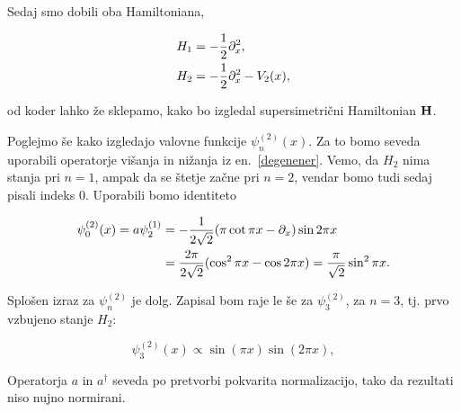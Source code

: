 Sedaj smo dobili oba Hamiltoniana,

\begin{align}
	H_1 &= -\frac{1}{2}\partial_x^2, \notag \\
	H_2 &= -\frac{1}{2}\partial_x^2 - V_2(x),
\end{align}

\ni od koder lahko \v ze sklepamo, kako bo izgledal supersimetri\v cni Hamiltonian $\mathbf{H}$.

Poglejmo \v se kako izgledajo valovne funkcije $\psi_n^{(2)}(x)$. Za to bomo seveda uporabili
operatorje vi\v sanja in ni\v zanja iz en.~\eqref{degenener}.
Vemo, da $H_2$ nima stanja pri $n = 1$, ampak da se \v stetje za\v cne pri $n = 2$, vendar bomo tudi
sedaj pisali indeks 0. Uporabili bomo identiteto

\begin{align}
	\psi_0^{(2)} (x) = a\psi_2^{(1)} &= -\frac{1}{2\sqrt{2}}(\pi \cot \pi x -
		\partial_x)\sin2\pi x \\
	&= \frac{2\pi}{2\sqrt{2}}(\cos^2\pi x - \cos 2\pi x) = \frac{\pi}{\sqrt{2}}\sin^2\pi x.
\end{align}

Splo\v sen izraz za $\psi_n^{(2)}$ je dolg. Zapisal bom raje le \v se za
$\psi_3^{(2)}$, za $n=3$, tj. prvo vzbujeno stanje $H_2$:

\begin{equation}
	\psi_3^{(2)}(x) \propto \sin (\pi x) \sin (2\pi x),
\end{equation}

\ni Operatorja $a$ in $a^\dagger$ seveda po pretvorbi pokvarita normalizacijo, tako da rezultati niso nujno
normirani.
